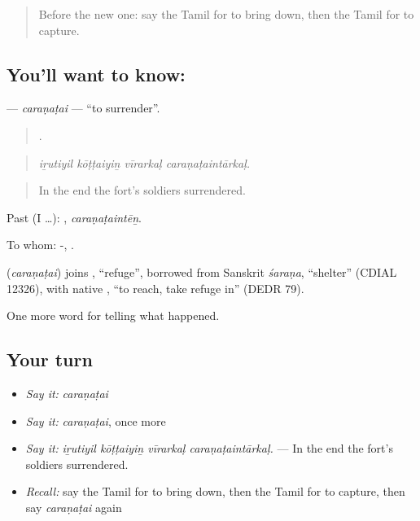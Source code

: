 \label{lesson:TA-C336-caranatai}



\begin{quote}
Before the new one: say the Tamil for to bring down, then the Tamil for to capture.
\end{quote}

\subsection*{You'll want to know: }
\textbf{} — \emph{caraṇaṭai} — \textquotedblleft{}to surrender\textquotedblright{}.

\begin{quote}
   .
\end{quote}

\begin{quote}
\emph{iṟutiyil kōṭṭaiyiṉ vīrarkaḷ caraṇaṭaintārkaḷ.}
\end{quote}

\begin{quote}
In the end the fort's soldiers surrendered.
\end{quote}

Past (I …): , \emph{caraṇaṭaintēṉ}.

To whom: -,  .

\begin{cousinweb}
\textbf{} (\emph{caraṇaṭai}) joins , \textquotedblleft{}refuge\textquotedblright{}, borrowed from Sanskrit \emph{śaraṇa}, \textquotedblleft{}shelter\textquotedblright{} (CDIAL 12326), with native , \textquotedblleft{}to reach, take refuge in\textquotedblright{} (DEDR 79).
\end{cousinweb}

\begin{grammarlens}[title={What you've built}]
One more word for telling what happened.
\end{grammarlens}

\subsection*{Your turn}
\begin{itemize}
\raggedright
  \item \emph{Say it:} \emph{caraṇaṭai}
  \item \emph{Say it:} \emph{caraṇaṭai}, once more
  \item \emph{Say it:} \emph{iṟutiyil kōṭṭaiyiṉ vīrarkaḷ caraṇaṭaintārkaḷ.} — In the end the fort's soldiers surrendered.
  \item \emph{Recall:} say the Tamil for to bring down, then the Tamil for to capture, then say \emph{caraṇaṭai} again
\end{itemize}

